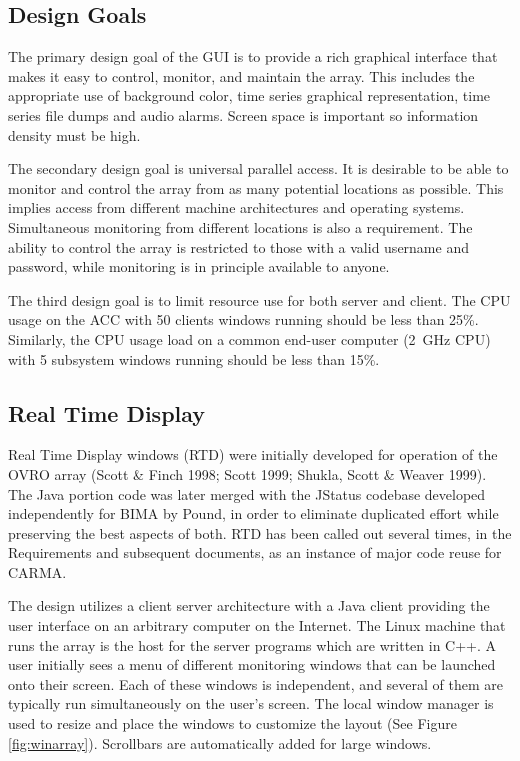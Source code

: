 \documentclass[preprint]{aastex}
\begin{document}
\subsection{Design Goals}

The primary design goal of the GUI is to provide a rich graphical interface
that makes it easy to control, monitor, and maintain the array.
This includes the appropriate use of background color, time series
graphical representation, time series file dumps and audio alarms.
Screen space is important so information density must be high.

The secondary design goal is universal parallel access.  It is desirable to
be able to monitor and control the array from as many potential locations
as possible.  This implies access from different machine architectures
and operating systems.  Simultaneous monitoring from different locations
is also a requirement.  The ability to control the array is restricted to
those with a valid username and password, while monitoring is in principle
available to anyone.

The third design goal is to limit resource use for both server and
client.  The CPU usage on the ACC with 50 clients windows running should 
be less than 25\%.  Similarly, the CPU usage load on a common end-user
computer (2~GHz CPU) with 5 subsystem windows running should be
less than 15\%. 

\subsection{Real Time Display}

Real Time Display windows (RTD) were initially developed for operation
of the OVRO array (Scott \& Finch 1998; Scott 1999; Shukla, Scott \&
Weaver 1999).  The Java portion code was later merged with the JStatus
codebase developed independently for BIMA by Pound, in order to eliminate
duplicated effort while preserving the best aspects of both.  RTD has been
called out several times, in the Requirements and subsequent documents,
as an instance of major code reuse for CARMA.

The design utilizes a client server architecture with a Java client
providing the user interface on an arbitrary computer on the Internet. The
Linux machine that runs the array is the host for the server programs which
are written in C++. A user initially sees a menu of different monitoring
windows that can be launched onto their screen. Each of these windows is
independent, and several of them are typically run simultaneously on the
user's screen. The local window manager is used to resize and place
the windows to customize the layout (See Figure \ref{fig:winarray}).
Scrollbars are automatically added for large windows.
\end{document}
